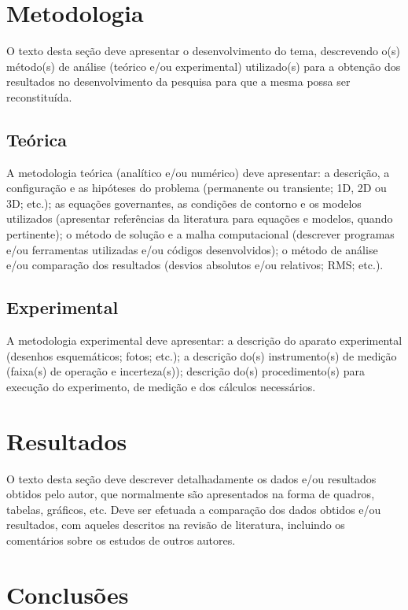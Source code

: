 \documentclass[%
  article,%
  10pt,%
  a4paper,%
  fleqn,%
  oneside,%
  sumario = tradicional,%
  chapter = TITLE,%
  section = TITLE,%
]{abntex2}
\begin{document}
\section{Metodologia}\label{sec:met}

O texto desta seção deve apresentar o desenvolvimento do tema, descrevendo o(s) método(s) de análise (teórico e/ou experimental) utilizado(s) para a obtenção dos resultados no desenvolvimento da pesquisa para que a mesma possa ser reconstituída.

\subsection{Teórica}\label{ssec:teor}

A metodologia teórica (analítico e/ou numérico) deve apresentar: a descrição, a configuração e as hipóteses do problema (permanente ou transiente; 1D, 2D ou 3D; etc.); as equações governantes, as condições de contorno e os modelos utilizados (apresentar referências da literatura para equações e modelos, quando pertinente); o método de solução e a malha computacional (descrever programas e/ou ferramentas utilizadas e/ou códigos desenvolvidos); o método de análise e/ou comparação dos resultados (desvios absolutos e/ou relativos; RMS; etc.).

\subsection{Experimental}\label{ssec:exp}

A metodologia experimental deve apresentar: a descrição do aparato experimental (desenhos esquemáticos; fotos; etc.); a descrição do(s) instrumento(s) de medição (faixa(s) de operação e incerteza(s)); descrição do(s) procedimento(s) para execução do experimento, de medição e dos cálculos necessários.

\section{Resultados}\label{sec:res}

O texto desta seção deve descrever detalhadamente os dados e/ou resultados obtidos pelo autor, que normalmente são apresentados na forma de quadros, tabelas, gráficos, etc. Deve ser efetuada a comparação dos dados obtidos e/ou resultados, com aqueles descritos na revisão de literatura, incluindo os comentários sobre os estudos de outros autores.

\section{Conclusões}\label{sec:concl}
\end{document}
